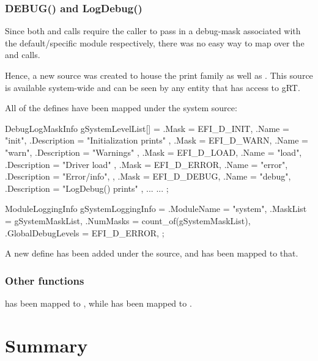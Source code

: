 \subsubsection{DEBUG() and LogDebug()}

Since both  and  calls require the caller to pass in a debug-mask associated with the default/specific 
module respectively, there was no easy way to map over the  and  calls. 

Hence, a new  source was created to house the  print family as well as . This source is available 
system-wide and can be seen by any entity that has access to gRT. 

All of the  defines have been mapped under the system source:

\begin{SampleCode}
DebugLogMaskInfo gSystemLevelList[] = {
    {
        .Mask = EFI_D_INIT,
        .Name = "init",
        .Description = "Initialization prints"
    },
    {
        .Mask = EFI_D_WARN,
        .Name = "warn",
        .Description = "Warnings"
    },
    {
        .Mask = EFI_D_LOAD,
        .Name = "load",
        .Description = "Driver load"
    },
    {
        .Mask = EFI_D_ERROR,
        .Name = "error",
        .Description = "Error/info",
    },
    {
        .Mask = EFI_D_DEBUG,
        .Name = "debug",
        .Description = "LogDebug() prints"
    },        
    ...
    ...
};

ModuleLoggingInfo gSystemLoggingInfo = {
    .ModuleName = "system",
    .MaskList = gSystemMaskList,
    .NumMasks = count_of(gSystemMaskList),
    .GlobalDebugLevels = {
        EFI_D_ERROR,
    }
};

\end{SampleCode}

A new  define has been added under the  source, and  has been mapped to that. 

\subsubsection{Other functions}
 has been mapped to , while  has been mapped to .

\section{Summary}

